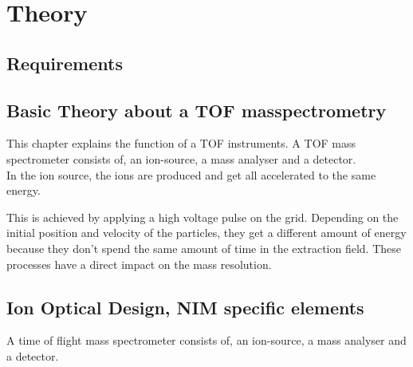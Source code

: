 \section{Theory}

	\subsection{Requirements}
	
	\subsection{Basic Theory about a TOF masspectrometry} %
	This chapter explains the function of a TOF instruments. A TOF mass spectrometer consists of, an ion-source, a mass analyser and a detector.\\
	In the ion source, the ions are produced and get all accelerated to the same energy.
	
	This is achieved by applying a high voltage pulse on the grid. %
	Depending on the initial position and velocity of the particles, they get a different amount of energy because they don't spend the same amount of time in the extraction field. These processes have a direct impact on the mass resolution. %
	
	
	\subsection{Ion Optical Design, NIM specific elements} %
	A time of flight mass spectrometer consists of, an ion-source, a mass analyser and a detector.\\
	
